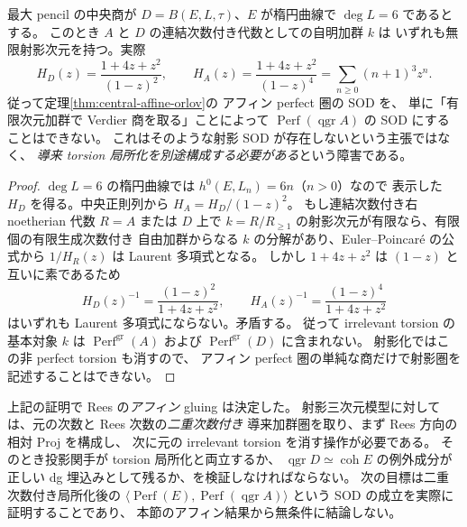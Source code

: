 \begin{proposition}[射影圏への降下の際に残る非正則頂点]
\label{prop:central-vertex-obstruction}
最大 pencil の中央商が
$D=B(E,L,\tau)$、$E$ が楕円曲線で $\deg L=6$ であるとする。
このとき $A$ と $D$ の連結次数付き代数としての自明加群 $k$ は
いずれも無限射影次元を持つ。実際
\[
 H_D(z)=\frac{1+4z+z^2}{(1-z)^2},\qquad
 H_A(z)=\frac{1+4z+z^2}{(1-z)^4}
   =\sum_{n\ge0}(n+1)^3z^n.
\]
従って定理\ref{thm:central-affine-orlov}の
アフィン perfect 圏の SOD を、
単に「有限次元加群で Verdier 商を取る」ことによって
$\operatorname{Perf}(\operatorname{qgr}A)$ の SOD にすることはできない。
これはそのような射影 SOD が存在しないという主張ではなく、
\emph{導来 torsion 局所化を別途構成する必要がある}という障害である。
\end{proposition}
\begin{proof}
$\deg L=6$ の楕円曲線では $h^0(E,L_n)=6n$（$n>0$）なので
表示した $H_D$ を得る。中央正則列から $H_A=H_D/(1-z)^2$。
もし連結次数付き右 noetherian 代数 $R=A$ または $D$ 上で
$k=R/R_{\ge1}$ の射影次元が有限なら、有限個の有限生成次数付き
自由加群からなる $k$ の分解があり、Euler--Poincar\'e の公式から
$1/H_R(z)$ は Laurent 多項式となる。
しかし $1+4z+z^2$ は $(1-z)$ と互いに素であるため
\[
 H_D(z)^{-1}=\frac{(1-z)^2}{1+4z+z^2},\qquad
 H_A(z)^{-1}=\frac{(1-z)^4}{1+4z+z^2}
\]
はいずれも Laurent 多項式にならない。矛盾する。
従って irrelevant torsion の基本対象 $k$ は
$\operatorname{Perf}^{\mathrm{gr}}(A)$ および
$\operatorname{Perf}^{\mathrm{gr}}(D)$ に含まれない。
射影化ではこの非 perfect torsion も消すので、
アフィン perfect 圏の単純な商だけで射影圏を記述することはできない。
\end{proof}

\begin{remark}[次の具体的な比較]
上記の証明で Rees の\emph{アフィン} gluing は決定した。
射影三次元模型に対しては、元の次数と Rees 次数の\emph{二重次数付き}
導来加群圏を取り、まず Rees 方向の相対 Proj を構成し、
次に元の irrelevant torsion を消す操作が必要である。
そのとき投影関手が torsion 局所化と両立するか、
$\operatorname{qgr}D\simeq\operatorname{coh}E$ の例外成分が
正しい dg 埋込みとして残るか、を検証しなければならない。
次の目標は二重次数付き局所化後の
$\langle\operatorname{Perf}(E),\operatorname{Perf}(\operatorname{qgr}A)\rangle$
という SOD の成立を実際に証明することであり、
本節のアフィン結果から無条件に結論しない。
\end{remark}

